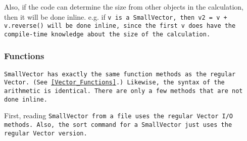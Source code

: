 Also, if the code can determine the size from other objects in the calculation, then
it will be done inline.  e.g. if \tt{v} is a \tt{SmallVector}, then 
\tt{v2 = v + v.reverse()} will be done inline, since the first \tt{v} does have 
the compile-time knowledge about the size of the calculation.

\subsubsection{Functions}
\label{SmallVector_Functions}

\tt{SmallVector} has exactly the same
function methods as the regular \tt{Vector}.  
(See \ref{Vector_Functions}.)
Likewise, the syntax of the
arithmetic is identical.  There are only a few methods that 
are not done inline.  

First, reading \tt{SmallVector} from a file 
uses the regular
\tt{Vector} I/O methods.  
Also, the \tt{sort} command for a \tt{SmallVector} just uses the
regular \tt{Vector} version.

